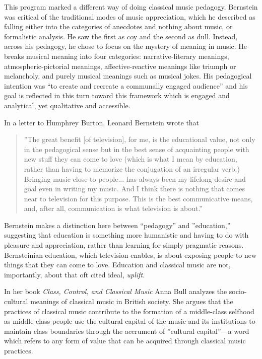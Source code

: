 \documentclass[12pt,letterpaper]{article}
\begin{document}
	This program marked a different way of doing classical 
	music
	pedagogy. Bernstein was critical of the traditional modes of music 
	appreciation, which he described as falling either into the categories 
	of anecdotes and nothing about music, or formalistic analysis. He saw 
	the first as coy and
	the second as dull. Instead, across his pedagogy, he chose to focus on 
	the mystery of meaning in music. He breaks musical meaning into four 
	categories: narrative-literary meanings, atmospheric-pictorial meanings,
	affective-reactive meanings like triumph or melancholy, and purely 
	musical meanings such as musical jokes.\autocite[14]{Kopfstein}  His 
	pedagogical intention 
	was ``to create and recreate a communally engaged 
	audience''\autocite[51]{Kopfstein} and his goal is reflected in this
	turn toward this framework which is engaged and analytical, yet 
	qualitative and accessible.  
 	
	In a letter to Humphrey Burton, Leonard Bernstein wrote that 

	\begin{quote}
	''The great
	benefit [of television], for me, is the educational value, not only in 
	the pedagogical sense but in the best sense of acquainting people with 
	new stuff they can come to love (which is what I mean by education, 
	rather than having to memorize the conjugation of an irregular verb.) 
	Bringing music close to people... has always been my lifelong desire and
	goal even in writing my music. And I think there is nothing that comes 
	near to television for this purpose. This is the best communicative 
	means, and, after all, communication is what television is 
	about.''\autocite[71]{Kopfstein}
	\end{quote}

	Bernstein makes a distinction here between ``pedagogy'' and 
	''education,'' suggesting that education is something more humanistic 
	and having to do with pleasure and appreciation, rather than learning 
	for simply pragmatic reasons. Bernsteinian education, which television 
	enables, is about exposing people to new things that they can come to 
	love. Education and classical music are not, importantly, about 
	that oft cited ideal, \textit{uplift.} 

	In her book \textit{Class, Control, and Classical Music} Anna Bull 
	analyzes the socio-cultural meanings of classical music in British
	society. She argues that the practices of classical music contribute to
	the formation of a middle-class selfhood as middle class people use the
	cultural capital of the music and its institutions to maintain class
	boundaries through the accrument of ''cultural capital''---a word which
	refers to any form of value that can be acquired through classical music 
	practices.\autocite[4]{Bull}\autocite[3]{Bull}
\end{document}
